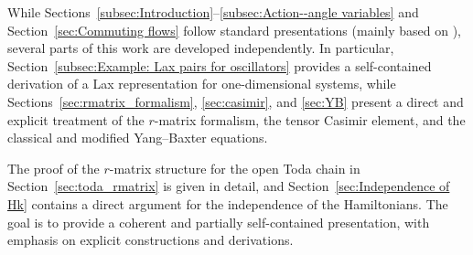 While Sections~\ref{subsec:Introduction}--\ref{subsec:Action--angle variables} and Section~\ref{sec:Commuting flows} follow standard presentations (mainly based on \cite{babelon2003introduction}), several parts of this work are developed independently. In particular, Section~\ref{subsec:Example: Lax pairs for oscillators} provides a self-contained derivation of a Lax representation for one-dimensional systems, while Sections~\ref{sec:rmatrix_formalism}, \ref{sec:casimir}, and \ref{sec:YB} present a direct and explicit treatment of the $r$-matrix formalism, the tensor Casimir element, and the classical and modified Yang–Baxter equations.

The proof of the $r$-matrix structure for the open Toda chain in Section~\ref{sec:toda_rmatrix} is given in detail, and Section~\ref{sec:Independence of Hk} contains a direct argument for the independence of the Hamiltonians. The goal is to provide a coherent and partially self-contained presentation, with emphasis on explicit constructions and derivations.